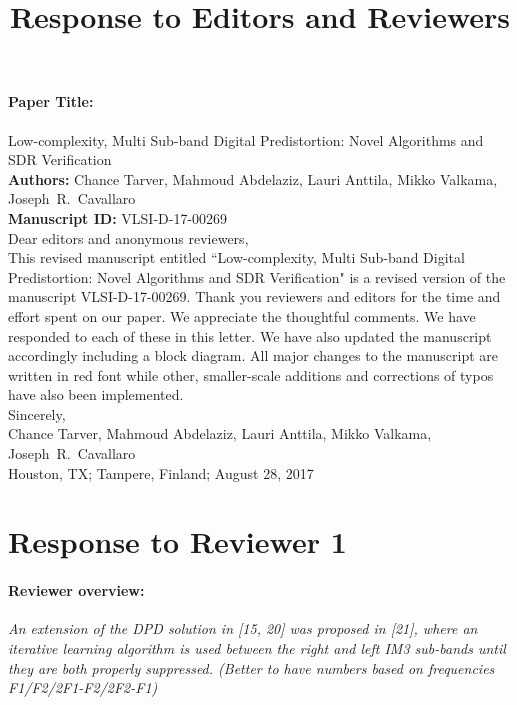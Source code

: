 \documentclass[]{article}
\title{Response to Editors and Reviewers}
\date{\vspace{-5ex}}
\author{\vspace{-5ex}}
\begin{document}
\maketitle

\paragraph{Paper Title:} Low-complexity, Multi Sub-band Digital Predistortion: Novel Algorithms and SDR Verification \\
\textbf{Authors:} Chance Tarver, Mahmoud Abdelaziz, Lauri Anttila, Mikko Valkama, Joseph~R.~Cavallaro\\
\textbf{Manuscript ID:} VLSI-D-17-00269\\

Dear editors and anonymous reviewers,\\


This revised manuscript entitled ``Low-complexity, Multi Sub-band Digital Predistortion: Novel Algorithms and SDR Verification" is a revised version of the manuscript VLSI-D-17-00269. 
Thank you reviewers and editors for the time and effort spent on our paper. We appreciate the thoughtful comments.
We have responded to each of these in this letter. 
We have also updated the manuscript accordingly including a block diagram. 
All major changes to the manuscript are written in {\color{red} red font} while other, smaller-scale additions and corrections of typos have also been implemented.\\

Sincerely,\\

Chance Tarver, Mahmoud Abdelaziz, Lauri Anttila, Mikko Valkama, Joseph~R.~Cavallaro\\

Houston, TX; Tampere, Finland; August 28, 2017


\newpage
\section{Response to Reviewer 1}
\paragraph{Reviewer overview:} \textit{An extension of the DPD solution in [15, 20] was proposed in [21], where an iterative learning algorithm is used between the right and left IM3 sub-bands until they are both properly suppressed. (Better to have numbers based on frequencies F1/F2/2F1-F2/2F2-F1)}
\end{document}
